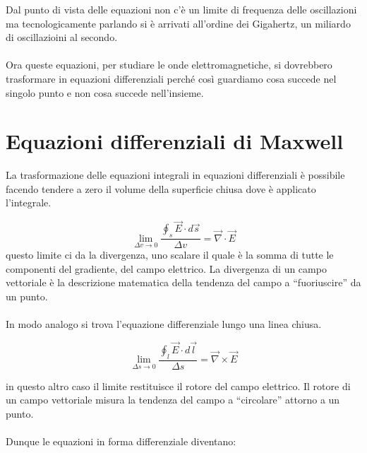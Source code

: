 Dal punto di vista delle equazioni non c'è un limite di frequenza delle oscillazioni ma tecnologicamente parlando si è arrivati all'ordine dei Gigahertz, un miliardo di oscillazioini al secondo.
\paragraph{}
Ora queste equazioni, per studiare le onde elettromagnetiche, si dovrebbero trasformare in equazioni differenziali perché così guardiamo cosa succede nel singolo punto e non cosa succede nell'insieme.

\section{Equazioni differenziali di Maxwell}

La trasformazione delle equazioni integrali in equazioni differenziali è possibile facendo tendere a zero il volume della superficie chiusa dove è applicato l'integrale.

\begin{equation*}
    \lim_{\Delta v \to 0}  \frac{\oint_s \vec{E} \cdot d\vec{s}}{\Delta v}  = \vec{\nabla}\cdot \vec{E}
\end{equation*}
questo limite ci da la divergenza, uno scalare il quale è la somma di tutte le componenti del gradiente, del campo elettrico. La divergenza di un campo vettoriale è la descrizione matematica
della tendenza del campo a “fuoriuscire” da un punto.

\paragraph{}
In modo analogo si trova l'equazione differenziale lungo una linea chiusa.

\begin{equation*}
    \lim_{\Delta s \to 0}  \frac{\oint_l \vec{E} \cdot d\vec{l}}{\Delta s}  = \vec{\nabla} \times \vec{E}
\end{equation*}

in questo altro caso il limite restituisce il rotore del campo elettrico. Il rotore di un campo vettoriale misura la tendenza del campo a “circolare” attorno a un punto.

\paragraph{}
Dunque le equazioni in forma differenziale diventano:

